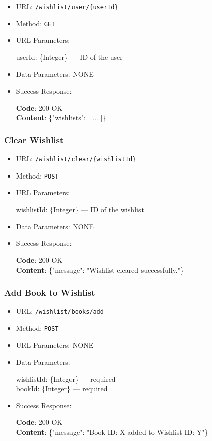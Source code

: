 \begin{itemize}
    \item URL: \texttt{/wishlist/user/\{userId\}}
    \item Method: \texttt{GET}
    \item URL Parameters:

    userId: \{Integer\} — ID of the user

    \item Data Parameters: NONE

    \item Success Response: \newline

    \textbf{Code}: 200 OK \\
    \textbf{Content}: \{"wishlists": [ ... ]\}
\end{itemize}

\subsubsection*{Clear Wishlist}

\begin{itemize}
    \item URL: \texttt{/wishlist/clear/\{wishlistId\}}
    \item Method: \texttt{POST}
    \item URL Parameters:

    wishlistId: \{Integer\} — ID of the wishlist

    \item Data Parameters: NONE

    \item Success Response: \newline

    \textbf{Code}: 200 OK \\
    \textbf{Content}: \{"message": "Wishlist cleared successfully."\}
\end{itemize}

\subsubsection*{Add Book to Wishlist}

\begin{itemize}
    \item URL: \texttt{/wishlist/books/add}
    \item Method: \texttt{POST}
    \item URL Parameters: NONE
    \item Data Parameters:

    wishlistId: \{Integer\} — required \\
    bookId: \{Integer\} — required

    \item Success Response: \newline

    \textbf{Code}: 200 OK \\
    \textbf{Content}: \{"message": "Book ID: X added to Wishlist ID: Y"\}
\end{itemize}

